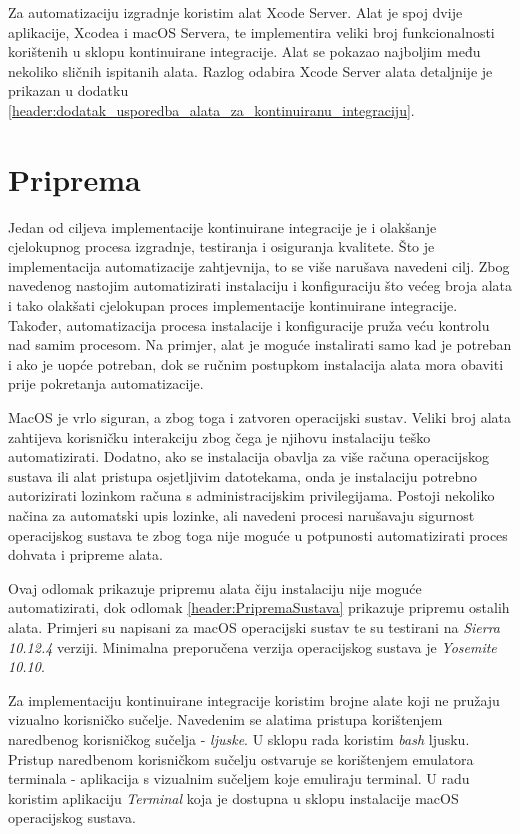 \documentclass[times, utf8, diplomski, numeric]{fer}
\begin{document}
Za automatizaciju izgradnje koristim alat Xcode Server. Alat je spoj dvije aplikacije, Xcodea i macOS Servera, te implementira veliki broj funkcionalnosti korištenih u sklopu kontinuirane integracije. Alat se pokazao najboljim među nekoliko sličnih ispitanih alata. Razlog odabira Xcode Server alata detaljnije je prikazan u dodatku \ref{header:dodatak_usporedba_alata_za_kontinuiranu_integraciju}.

\section{Priprema}

Jedan od ciljeva implementacije kontinuirane integracije je i olakšanje cjelokupnog procesa izgradnje, testiranja i osiguranja kvalitete. Što je implementacija automatizacije zahtjevnija, to se više narušava navedeni cilj. Zbog navedenog nastojim automatizirati instalaciju i konfiguraciju što većeg broja alata i tako olakšati cjelokupan proces implementacije kontinuirane integracije. Također, automatizacija procesa instalacije i konfiguracije pruža veću kontrolu nad samim procesom. Na primjer, alat je moguće instalirati samo kad je potreban i ako je uopće potreban, dok se ručnim postupkom instalacija alata mora obaviti prije pokretanja automatizacije.

MacOS je vrlo siguran, a zbog toga i zatvoren operacijski sustav. Veliki broj alata zahtijeva korisničku interakciju zbog čega je njihovu instalaciju teško automatizirati. Dodatno, ako se instalacija obavlja za više računa operacijskog sustava ili alat pristupa osjetljivim datotekama, onda je instalaciju potrebno autorizirati lozinkom računa s administracijskim privilegijama. Postoji nekoliko načina za automatski upis lozinke, ali navedeni procesi narušavaju sigurnost operacijskog sustava te zbog toga nije moguće u potpunosti automatizirati proces dohvata i pripreme alata.

Ovaj odlomak prikazuje pripremu alata čiju instalaciju nije moguće automatizirati, dok odlomak \ref{header:PripremaSustava} prikazuje pripremu ostalih alata. Primjeri su napisani za macOS operacijski sustav te su testirani na \textit{Sierra 10.12.4} verziji. Minimalna preporučena verzija operacijskog sustava je \textit{Yosemite 10.10}.

Za implementaciju kontinuirane integracije koristim brojne alate koji ne pružaju vizualno korisničko sučelje. Navedenim se alatima pristupa korištenjem naredbenog korisničkog sučelja - \textit{ljuske}. U sklopu rada koristim \textit{bash} ljusku. Pristup naredbenom korisničkom sučelju ostvaruje se korištenjem emulatora terminala - aplikacija s vizualnim sučeljem koje emuliraju terminal. U radu koristim aplikaciju \textit{Terminal} koja je dostupna u sklopu instalacije macOS operacijskog sustava.
\end{document}
